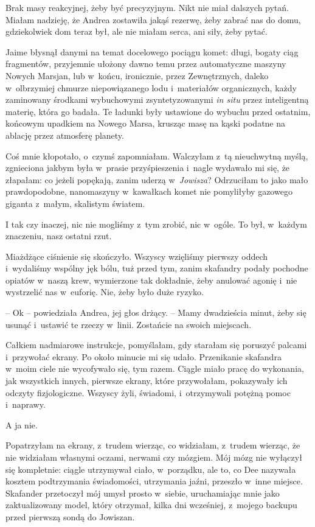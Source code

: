 \documentclass[oneside,polish,11pt,sfheadings]{mwbk}
\begin{document}
Brak masy reakcyjnej, żeby być precyzyjnym. Nikt nie miał dalszych
pytań. Miałam nadzieję, że Andrea zostawiła jakąś rezerwę, żeby zabrać
nas do domu, gdziekolwiek dom teraz był, ale nie miałam serca, ani siły,
żeby pytać.

Jaime błysnął danymi na temat docelowego pociągu komet: długi, bogaty
ciąg fragmentów, przyjemnie ułożony dawno temu przez automatyczne
maszyny Nowych Marsjan, lub w~końcu, ironicznie, przez Zewnętrznych,
daleko w~olbrzymiej chmurze niepowiązanego lodu i~materiałów
organicznych, każdy zaminowany środkami wybuchowymi zsyntetyzowanymi
\textit{in situ} przez inteligentną materię, która go badała. Te ładunki
były ustawione do wybuchu przed ostatnim, końcowym upadkiem na Nowego
Marsa, krusząc masę na kąski podatne na ablację przez atmosferę planety.

Coś mnie kłopotało, o~czymś zapomniałam. Walczyłam z~tą nieuchwytną
myślą, zgnieciona jakbym była w~prasie przyśpieszenia i~nagle wydawało
mi się, że złapałam: co jeżeli popękają, zanim uderzą w~\textit{Jowisza}?
Odrzuciłam to jako mało prawdopodobne, nanomaszyny w~kawałkach komet nie
pomyliłyby gazowego giganta z~małym, skalistym światem.

I tak czy inaczej, nic nie mogliśmy z~tym zrobić, nic w~ogóle. To był, w~każdym znaczeniu, nasz ostatni rzut.

Miażdżące ciśnienie się skończyło. Wszyscy wzięliśmy pierwszy oddech i~wydaliśmy wspólny jęk bólu, tuż przed tym, zanim skafandry podały
pochodne opiatów w~naszą krew, wymierzone tak dokładnie, żeby anulować
agonię i~nie wystrzelić nas w~euforię. Nie, żeby było duże ryzyko.

-- Ok -- powiedziała Andrea, jej głos drżący. -- Mamy dwadzieścia minut,
żeby się usunąć i~ustawić te rzeczy w~linii. Zostańcie na swoich
miejscach.

Całkiem nadmiarowe instrukcje, pomyślałam, gdy starałam się poruszyć
palcami i~przywołać ekrany. Po około minucie mi się udało. Przenikanie
skafandra w~moim ciele nie wycofywało się, tym razem. Ciągle miało pracę
do wykonania, jak wszystkich innych, pierwsze ekrany, które przywołałam,
pokazywały ich odczyty fizjologiczne. Wszyscy żyli, świadomi, i~otrzymywali potężną pomoc i~naprawy.

A ja nie.

Popatrzyłam na ekrany, z~trudem wierząc, co widziałam, z~trudem wierząc,
że nie widziałam własnymi oczami, nerwami czy mózgiem. Mój mózg nie
wyłączył się kompletnie: ciągle utrzymywał ciało, w~porządku, ale to, co
Dee nazywała kosztem podtrzymania świadomości, utrzymania jaźni,
przeszło w~inne miejsce. Skafander przetoczył mój umysł prosto w~siebie,
uruchamiając mnie jako zaktualizowany model, który otrzymał, kilka dni
wcześniej, z~mojego backupu przed pierwszą sondą do Jowiszan.
\end{document}
